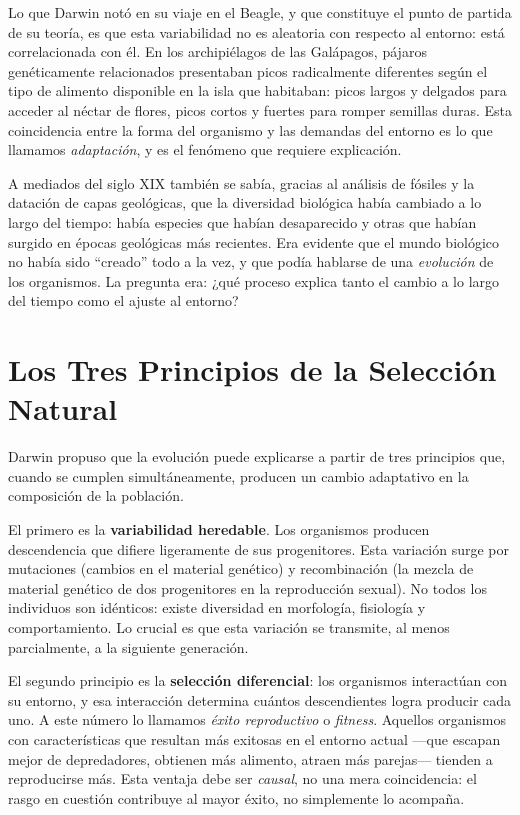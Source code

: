 \documentclass[
  letterpaper,
  DIV=11,
  numbers=noendperiod]{scrreprt}
\begin{document}
Lo que Darwin notó en su viaje en el Beagle, y que constituye el punto
de partida de su teoría, es que esta variabilidad no es aleatoria con
respecto al entorno: está correlacionada con él. En los archipiélagos de
las Galápagos, pájaros genéticamente relacionados presentaban picos
radicalmente diferentes según el tipo de alimento disponible en la isla
que habitaban: picos largos y delgados para acceder al néctar de flores,
picos cortos y fuertes para romper semillas duras. Esta coincidencia
entre la forma del organismo y las demandas del entorno es lo que
llamamos \emph{adaptación}, y es el fenómeno que requiere explicación.

A mediados del siglo XIX también se sabía, gracias al análisis de
fósiles y la datación de capas geológicas, que la diversidad biológica
había cambiado a lo largo del tiempo: había especies que habían
desaparecido y otras que habían surgido en épocas geológicas más
recientes. Era evidente que el mundo biológico no había sido ``creado''
todo a la vez, y que podía hablarse de una \emph{evolución} de los
organismos. La pregunta era: ¿qué proceso explica tanto el cambio a lo
largo del tiempo como el ajuste al entorno?

\section{Los Tres Principios de la Selección
Natural}\label{los-tres-principios-de-la-selecciuxf3n-natural}

Darwin propuso que la evolución puede explicarse a partir de tres
principios que, cuando se cumplen simultáneamente, producen un cambio
adaptativo en la composición de la población.

El primero es la \textbf{variabilidad heredable}. Los organismos
producen descendencia que difiere ligeramente de sus progenitores. Esta
variación surge por mutaciones (cambios en el material genético) y
recombinación (la mezcla de material genético de dos progenitores en la
reproducción sexual). No todos los individuos son idénticos: existe
diversidad en morfología, fisiología y comportamiento. Lo crucial es que
esta variación se transmite, al menos parcialmente, a la siguiente
generación.

El segundo principio es la \textbf{selección diferencial}: los
organismos interactúan con su entorno, y esa interacción determina
cuántos descendientes logra producir cada uno. A este número lo llamamos
\emph{éxito reproductivo} o \emph{fitness}. Aquellos organismos con
características que resultan más exitosas en el entorno actual ---que
escapan mejor de depredadores, obtienen más alimento, atraen más
parejas--- tienden a reproducirse más. Esta ventaja debe ser
\emph{causal}, no una mera coincidencia: el rasgo en cuestión contribuye
al mayor éxito, no simplemente lo acompaña.
\end{document}
